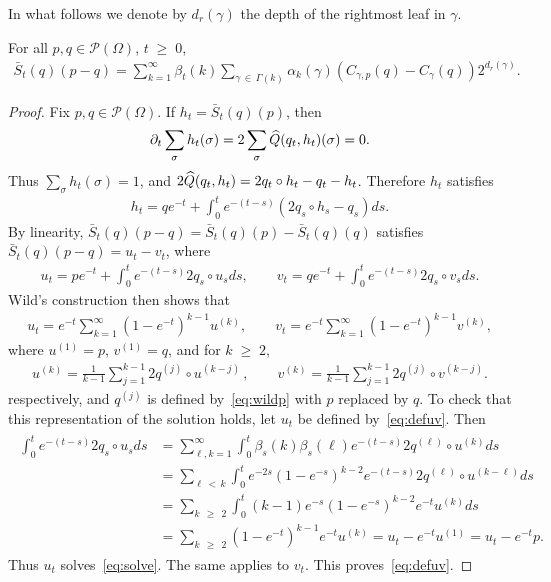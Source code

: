 \documentclass[AHL,Unicode,longabstracts,published]{cedram}
\renewcommand{\geq}{\;\geqslant\;}
\newcommand{\si}{\sigma}
\newcommand{\cP}{\mathcal{P}}
\let\b=\beta
\let\g=\gamma
\let\O=\Omega
\let\oldhat\hat
\renewcommand*{\hat}[1]{\mathchoice{\widehat{#1}}{\widehat{#1}}{\oldhat{#1}}{\oldhat{#1}}}
\begin{document}
In what follows we denote by $d_r(\g)$ the depth of the rightmost leaf in $\g$.

\begin{lemm}\label{lem:wildrep}
For all $p,q \in \cP(\O)$, $t\geq 0$,
\begin{align}\label{eq:topid}
\bar{S}_t(q)(p-q) = \sum_{k=1}^\infty\b_t(k) \sum_{\gamma\,\in\,\Gamma(k)}\alpha_k(\gamma)\left(C_{\gamma, p}(q)-C_{\gamma}(q)\right)2^{d_r(\gamma)}.
\end{align}
\end{lemm}

\begin{proof}
Fix $p,q \in \cP(\O)$. If $h_t=\bar{S}_t(q)(p)$, then
\begin{align*}
\partial_t \sum_{\sigma}h_t(\sigma) = 2\sum_{\sigma}\hat{Q}(q_t,h_t)(\si) = 0.
\end{align*}
Thus $ \sum_{\sigma}h_t(\sigma) = 1$, and $2\hat{Q}(q_t,h_{t})=2q_t \circ h_{t} - q_t - h_{t}$. Therefore $h_t$ satisfies
\begin{align}
h_t = qe^{-t} + \int_{0}^te^{-(t-s)}\left(2q_{s} \circ h_{s}-q_{s}\right)ds.
\end{align}
By linearity, $ \bar{S}_t(q)(p-q) =\bar{S}_t(q)(p) - \bar{S}_t(q)(q)$ satisfies $\bar{S}_t(q)(p-q) =u_t-v_t$, where
\begin{align}\label{eq:solve}
u_t = pe^{-t} + \int_{0}^te^{-(t-s)}2q_{s} \circ u_{s}ds,\qquad v_t = qe^{-t} + \int_{0}^te^{-(t-s)}2q_{s} \circ v_{s}ds.
\end{align}
Wild's construction then shows that
\begin{align}\label{eq:defuv}
u_t = e^{-t}\sum_{k=1}^{\infty}\left(1-e^{-t}\right)^{k-1}u^{(k)},\qquad v_t = e^{-t}\sum_{k=1}^{\infty}\left(1-e^{-t}\right)^{k-1}v^{(k)},
\end{align}
where $u^{(1)}= p$, $v^{(1)}= q$, and for $k\geq 2$,
\begin{align*}
u^{(k)}= \frac{1}{k-1}\sum_{j=1}^{k-1}2q^{(j)}\circ u^{(k-j)} \,,\qquad v^{(k)}= \frac{1}{k-1}\sum_{j=1}^{k-1}2q^{(j)}\circ v^{(k-j)}.
\end{align*}
respectively, and $q^{(j)}$ is defined by~\eqref{eq:wildp} with $p$ replaced by $q$. To check that this representation of the solution holds, let $u_t$ be defined by~\eqref{eq:defuv}. Then
\begin{align}\label{eq:defuv1}
\begin{split}
\int_{0}^te^{-(t-s)}2q_{s} \circ u_{s}ds &= \sum_{\ell,k=1}^{\infty}
\int_{0}^t\b_s(k)\b_s(\ell)e^{-(t-s)}2q^{(\ell)} \circ u^{(k)}ds\\
& =\sum_{\ell\,<\,k}
\int_{0}^te^{-2s}\left(1-e^{-s}\right)^{k-2}e^{-(t-s)}2q^{(\ell)} \circ u^{(k-\ell)}ds\\
& =\sum_{k\,\geq\,2}
\int_{0}^t(k-1)e^{-s}\left(1-e^{-s}\right)^{k-2}e^{-t} u^{(k)}ds \\
& =\sum_{k\,\geq\,2} \left(1-e^{-t}\right)^{k-1}e^{-t} u^{(k)} = u_t - e^{-t} u^{(1)} = u_t - e^{-t} p.
\end{split}
\end{align}
Thus $u_t$ solves~\eqref{eq:solve}. The same applies to $v_t$. This proves~\eqref{eq:defuv}.


\end{proof}
\end{document}
